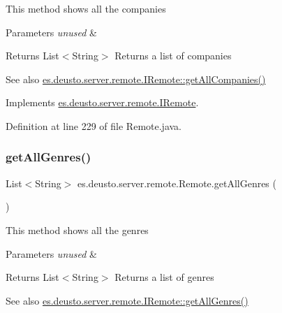 This method shows all the companies 
\begin{DoxyParams}{Parameters}
{\em unused} & \\
\hline
\end{DoxyParams}
\begin{DoxyReturn}{Returns}
List$<$\+String$>$ Returns a list of companies 
\end{DoxyReturn}
\begin{DoxySeeAlso}{See also}
\hyperlink{interfacees_1_1deusto_1_1server_1_1remote_1_1_i_remote_a79aad360068d216b63b8afadcc6bcc92}{es.\+deusto.\+server.\+remote.\+I\+Remote\+::get\+All\+Companies()} 
\end{DoxySeeAlso}


Implements \hyperlink{interfacees_1_1deusto_1_1server_1_1remote_1_1_i_remote_a79aad360068d216b63b8afadcc6bcc92}{es.\+deusto.\+server.\+remote.\+I\+Remote}.



Definition at line 229 of file Remote.\+java.

\mbox{\label{classes_1_1deusto_1_1server_1_1remote_1_1_remote_a7a276118f167e088bbb56d962b2cc18f}} 
\subsubsection{\texorpdfstring{get\+All\+Genres()}{getAllGenres()}}
{\footnotesize\ttfamily List$<$String$>$ es.\+deusto.\+server.\+remote.\+Remote.\+get\+All\+Genres (\begin{DoxyParamCaption}{ }\end{DoxyParamCaption})}

This method shows all the genres 
\begin{DoxyParams}{Parameters}
{\em unused} & \\
\hline
\end{DoxyParams}
\begin{DoxyReturn}{Returns}
List$<$\+String$>$ Returns a list of genres 
\end{DoxyReturn}
\begin{DoxySeeAlso}{See also}
\hyperlink{interfacees_1_1deusto_1_1server_1_1remote_1_1_i_remote_a90995befbd81e0781056f75645997fe9}{es.\+deusto.\+server.\+remote.\+I\+Remote\+::get\+All\+Genres()} 
\end{DoxySeeAlso}


